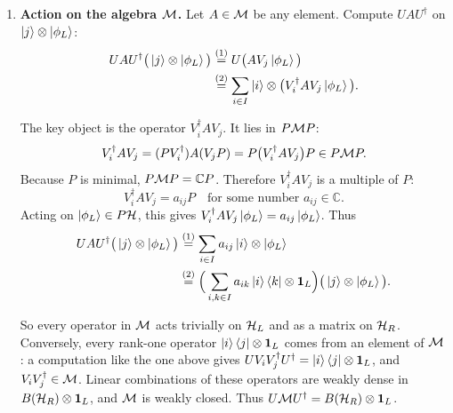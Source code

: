 \begin{itemize}
\begin{keyresult}
\begin{enumerate}[leftmargin=*]
So $U$ is an isometry with $UU^\dagger=\id$, which means $U$ is unitary.

\item \textbf{Action on the algebra $\mathcal{M}$.}
Let $A \in \mathcal{M}$ be any element. Compute $U A U^\dagger$ on $\ket{j} \otimes \ket{\phi_L}$:
\begin{align}
U A U^\dagger \big(\ket{j} \otimes \ket{\phi_L}\big)
&\overset{(1)}{=} U \big(A V_j \ket{\phi_L}\big) \notag\\
&\overset{(2)}{=} \sum_{i \in I} \ket{i} \otimes \big(V_i^\dagger A V_j \ket{\phi_L}\big) . \notag
\end{align}
\quad
{}

The key object is the operator $V_i^\dagger A V_j$. It lies in $P\mathcal{M} P$:
\[
V_i^\dagger A V_j = (P V_i^\dagger) A (V_j P) = P \big(V_i^\dagger A V_j\big) P \in P \mathcal{M} P .
\]
Because $P$ is minimal, $P \mathcal{M} P = \mathbb{C} P$. Therefore $V_i^\dagger A V_j$ is a multiple of $P$:
\[
V_i^\dagger A V_j = a_{ij} P \quad \text{for some number } a_{ij} \in \mathbb{C} .
\]
Acting on $\ket{\phi_L} \in P\mathcal{H}$, this gives $V_i^\dagger A V_j \ket{\phi_L} = a_{ij} \ket{\phi_L}$. Thus
\begin{align}
U A U^\dagger \big(\ket{j} \otimes \ket{\phi_L}\big)
&\overset{(1)}{=} \sum_{i \in I} a_{ij} \ket{i} \otimes \ket{\phi_L} \notag\\
&\overset{(2)}{=} \Big(\sum_{i,k \in I} a_{ik} \ket{i}\bra{k} \otimes \mathbf{1}_L \Big) \big(\ket{j} \otimes \ket{\phi_L}\big) . \notag
\end{align}
\quad
{}

So every operator in $\mathcal{M}$ acts trivially on $\mathcal{H}_L$ and as a matrix on $\mathcal{H}_R$. Conversely, every rank-one
operator $\ket{i}\bra{j}\otimes\mathbf{1}_L$ comes from an element of $\mathcal{M}$: a computation like the one above gives
$U V_i V_j^\dagger U^\dagger = \ket{i}\bra{j}\otimes\mathbf{1}_L$, and $V_iV_j^\dagger\in\mathcal{M}$. Linear combinations of
these operators are weakly dense in $B(\mathcal{H}_R)\otimes\mathbf{1}_L$, and $\mathcal{M}$ is weakly closed. Thus
$U \mathcal{M} U^\dagger = B(\mathcal{H}_R) \otimes \mathbf{1}_L$.


\end{enumerate}
\end{keyresult}
\end{itemize}

